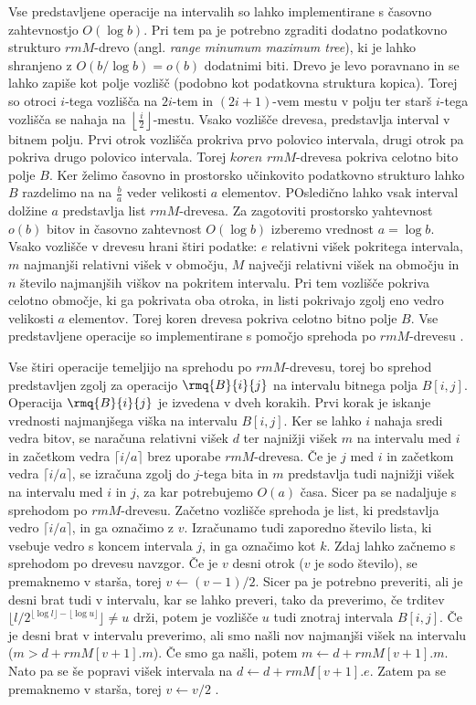 Vse predstavljene operacije na intervalih so lahko implementirane s časovno zahtevnostjo $O(\log{b})$. Pri tem pa je potrebno zgraditi dodatno podatkovno strukturo $rmM$-drevo (angl. \textit{range minumum maximum tree}), ki je lahko shranjeno z $O(b/\log{b})=o(b)$ dodatnimi biti. Drevo je levo poravnano in se lahko zapiše kot polje vozlišč (podobno kot podatkovna struktura kopica). Torej so otroci $i$-tega vozlišča na $2i$-tem in $(2i+1)$-vem mestu v polju ter starš $i$-tega vozlišča se nahaja na $\left\lfloor\frac{i}{2}\right\rfloor$-mestu. Vsako vozlišče drevesa, predstavlja interval v bitnem polju. Prvi otrok vozlišča prokriva prvo polovico intervala, drugi otrok pa pokriva drugo polovico intervala. Torej $koren$ $rmM$-drevesa pokriva celotno bito polje $B$. Ker želimo časovno in prostorsko učinkovito podatkovno strukturo lahko $B$ razdelimo na na $\frac{b}{a}$ veder velikosti $a$ elementov. POsledično lahko vsak interval dolžine $a$ predstavlja list $rmM$-drevesa. Za zagotoviti prostorsko yahtevnost $o(b)$ bitov in časovno zahtevnost $O(\log{b})$ izberemo vrednost $a = \log{b}$. Vsako vozlišče v drevesu hrani štiri podatke: $e$ relativni višek pokritega intervala, $m$ najmanjši relativni višek v območju, $M$ največji relativni višek na območju in $n$ število najmanjših viškov na pokritem intervalu. Pri tem vozlišče pokriva celotno območje, ki ga pokrivata oba otroka, in listi pokrivajo zgolj eno vedro velikosti $a$ elementov. Torej koren drevesa pokriva celotno bitno polje $B$. Vse predstavljene operacije so implementirane s pomočjo sprehoda po $rmM$-drevesu \cite{Navarro2016}.

Vse štiri operacije temeljijo na sprehodu po $rmM$-drevesu, torej bo sprehod predstavljen zgolj za operacijo $\rmq{B}{i}{j}$ na intervalu bitnega polja $B[i,j]$. Operacija $\rmq{B}{i}{j}$ je izvedena v dveh korakih. Prvi korak je iskanje vrednosti najmanjšega viška na intervalu $B[i,j]$. Ker se lahko $i$ nahaja sredi vedra bitov, se naračuna relativni višek $d$ ter najnižji višek $m$ na intervalu med $i$ in začetkom vedra $\lceil i/a\rceil$ brez uporabe $rmM$-drevesa. Če je $j$ med $i$ in začetkom vedra $\lceil i/a\rceil$, se izračuna zgolj do $j$-tega bita in $m$ predstavlja tudi najnižji višek na intervalu med $i$ in $j$, za kar potrebujemo $O(a)$ časa. Sicer pa se nadaljuje s sprehodom po $rmM$-drevesu. Začetno vozlišče sprehoda je list, ki predstavlja vedro $\lceil i/a\rceil$, in ga označimo z $v$. Izračunamo tudi zaporedno število lista, ki vsebuje vedro s koncem intervala $j$, in ga označimo kot $k$. Zdaj lahko začnemo s sprehodom po drevesu navzgor. Če je $v$ desni otrok ($v$ je sodo število), se premaknemo v starša, torej $v\leftarrow (v-1)/2$. Sicer pa je potrebno preveriti, ali je desni brat tudi v intervalu, kar se lahko preveri, tako da preverimo, če trditev $\lfloor l/2^{\lfloor \log l\rfloor- \lfloor \log u \rfloor}\rfloor\ne u$ drži, potem je vozlišče $u$ tudi znotraj intervala $B[i,j]$. Če je desni brat v intervalu preverimo, ali smo našli nov najmanjši višek na intervalu ($m>d+rmM[v+1].m$). Če smo ga našli, potem $m\leftarrow d+rmM[v+1].m$. Nato pa se še popravi višek intervala na $d\leftarrow d+rmM[v+1].e$. Zatem pa se premaknemo v starša, torej $v\leftarrow v/2$ \cite{Navarro2016}.

